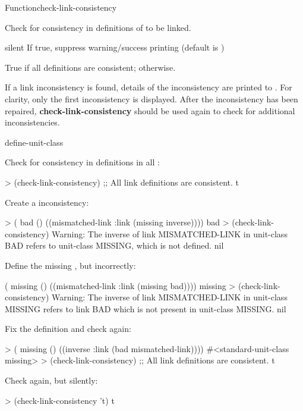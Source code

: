 \documentclass[10pt,twoside,english,pdftex]{article}
\begin{document}
\begin{functiondoc}{Function}{check-link-consistency}{
    \returns{} }
%

\fnsyntax

\fnpurpose Check for consistency in  definitions of
 to be linked.

\fnpackage {}

\fnmodule {}

\fnargs
\begin{args}{silent}
\arg[silent] If true, suppress warning/success printing (default is \nil) 
\end{args}

\fnreturns True if all  definitions are consistent; \nil{}
otherwise. 

\fndescription If a link inconsistency is found, details of the
inconsistency are printed to .  For clarity,
only the first inconsistency is displayed.  After the inconsistency
has been repaired, \textbf{check-link-consistency} should be used
again to check for additional inconsistencies.

\begin{alsos}{define-unit-class}
\end{alsos}

\fnexamples
Check for consistency in  definitions in all
: 
%
\W\supp
\begin{example}
> (check-link-consistency)
;; All link definitions are consistent.
t
\end{example}
%
%
%
Create a  inconsistency:
%
\W\supp\notpretop
\begin{example}
> ( bad () 
     ((mismatched-link :link (missing inverse))))
bad
> (check-link-consistency)
Warning: The inverse of link MISMATCHED-LINK in unit-class BAD refers
         to unit-class MISSING, which is not defined.
nil
\end{example}
%
Define the missing , but incorrectly:
%
\W\supp\notpretop
\begin{example}
( missing () ((mismatched-link :link (missing bad))))
missing
> (check-link-consistency)
Warning: The inverse of link MISMATCHED-LINK in unit-class MISSING
         refers to link BAD which is not present in unit-class MISSING.
nil
\end{example}
%
Fix the definition and check again:
%
\W\supp\notpretop
\begin{example}
> ( missing () ((inverse :link (bad mismatched-link))))
#<standard-unit-class missing>
> (check-link-consistency)
;; All link definitions are consistent.
t
\end{example}
%
Check again, but silently:
%
\W\supp\notpretop
\begin{example}
> (check-link-consistency 't)
t
\end{example}

\end{functiondoc}
\end{document}
